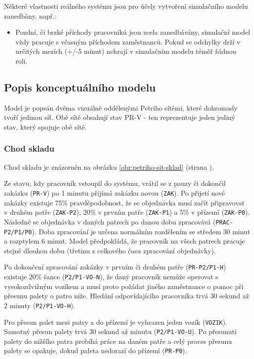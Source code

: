 \documentclass[11pt]{article}
\begin{document}
	Některé vlastnosti reálného systému jsou pro účely vytvoření simulačního modelu zanedbány, např.:
	\begin{itemize}
		\item Pozdní, či brzké příchody pracovníků jsou zcela zanedbávány, simulační model vždy pracuje s včasným příchodem zaměstnanců.
		Pokud se odchylky drží v určitých mezích (+/-5 minut) nehrají v simulačním modelu téměř žádnou roli.
	\end{itemize}
	
	\subsection{Popis konceptuálního modelu}
	Model je popsán dvěma vizuálně oddělenými Petriho sítěmi, které dohromady tvoří jedinou síť.
	Obě sítě obsahují stav \textsf{PR-V} - ten reprezentuje jeden jediný stav, který spojuje obě sítě.
	
	\subsubsection{Chod skladu}
	Chod skladu je znázorněn na obrázku \ref{obr:petriho-sit-sklad} (strana \pageref{obr:petriho-sit-sklad}).
	
	Ze stavu, kdy pracovník vstoupil do systému, vrátil se z pauzy či dokončil zakázku (\texttt{PR-V}) po 1 minutu přijímá zakázku novou (\texttt{ZAK}).
	Po přijetí nové zakázky existuje 75\% pravděpodobnost, že se objednávka musí začít připravovat v druhém patře (\texttt{ZAK-P2}), 20\% v prvním patře (\texttt{ZAK-P1}) a 5\% v přízemí (\texttt{ZAK-P0}).
	Následně se objednávka v daných patrech po danou dobu zpracovává (\texttt{PRAC-P2/P1/P0}).
	Doba zpracování je určena normálním rozdělením se středem 30 minut a rozptylem 6 minut.
	Model předpokládá, že pracovník na všech patrech pracuje stejně dlouhou dobu (třetinu z celkového času zpracování objednávky).
	
	Po dokončení zpracování zakázky v prvním či druhém patře (\texttt{PR-P2/P1-H}) existuje 20\% šance (\texttt{P2/P1-VO-N}), že daný pracovník nemůže operovat s vysokozdvižným vozíkem a musí proto požádat jiného zaměstnance o pomoc při přesunu palety o patro níže.
	Hledání odpovídajícího pracovníka trvá 30 sekund až 2 minuty (\texttt{P2/P1-VO-H}).
	
	Pro přesun palet mezi patry a do přízemí je vyhrazen jeden vozík (\texttt{VOZIK}).
	Samotný přesun palety trvá 30 sekund až minutu (\texttt{P2/P1-VO-U}).
	Po přesunutí palety do nižšího patra probíhá práce na daném patře a celý proces přesunu palety se opakuje, dokud paleta nedorazí do přízemí (\texttt{PR-P0}).
	
\end{document}
